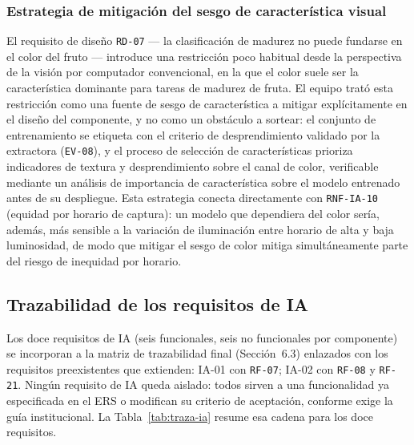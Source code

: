 \documentclass[11pt,a4paper]{article}
\newcommand{\id}[1]{\texttt{#1}}
\begin{document}
\subsubsection{Estrategia de mitigación del sesgo de característica visual}

El requisito de diseño \id{RD-07} --- la clasificación de madurez no puede fundarse en el color del
fruto --- introduce una restricción poco habitual desde la perspectiva de la visión por computador
convencional, en la que el color suele ser la característica dominante para tareas de madurez de
fruta. El equipo trató esta restricción como una fuente de sesgo de característica a mitigar
explícitamente en el diseño del componente, y no como un obstáculo a sortear: el conjunto de
entrenamiento se etiqueta con el criterio de desprendimiento validado por la extractora
(\id{EV-08}), y el proceso de selección de características prioriza indicadores de textura y
desprendimiento sobre el canal de color, verificable mediante un análisis de importancia de
característica sobre el modelo entrenado antes de su despliegue. Esta estrategia conecta
directamente con \id{RNF-IA-10} (equidad por horario de captura): un modelo que dependiera del
color sería, además, más sensible a la variación de iluminación entre horario de alta y baja
luminosidad, de modo que mitigar el sesgo de color mitiga simultáneamente parte del riesgo de
inequidad por horario.

\subsection{Trazabilidad de los requisitos de IA}

Los doce requisitos de IA (seis funcionales, seis no funcionales por componente) se incorporan a la
matriz de trazabilidad final (Sección~6.3) enlazados con los requisitos preexistentes que
extienden: IA-01 con \id{RF-07}; IA-02 con \id{RF-08} y \id{RF-21}. Ningún requisito de IA queda
aislado: todos sirven a una funcionalidad ya especificada en el ERS o modifican su criterio de
aceptación, conforme exige la guía institucional. La Tabla~\ref{tab:traza-ia} resume esa cadena
para los doce requisitos.
\end{document}

